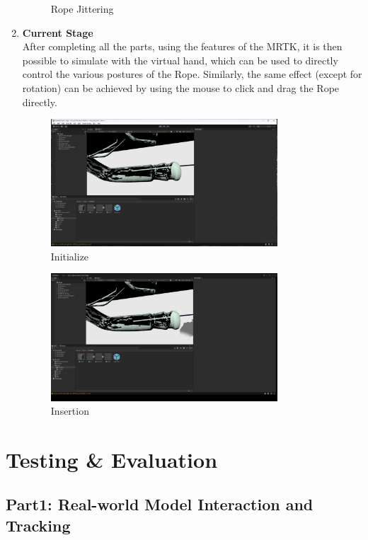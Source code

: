 \documentclass[12pt]{article}
\begin{document}
\begin{enumerate}
\begin{figure}[H]
            \caption{Rope Jittering}
      \end{figure}
      \item \textbf{Current Stage}
      \\
      After completing all the parts, using the features of the MRTK, it is then possible to simulate with the virtual hand, which can be used to directly control the various postures of the Rope. Similarly, the same effect (except for rotation) can be achieved by using the mouse to click and drag the Rope directly.
      \begin{figure}[H]
            \centering
            \includegraphics[width=0.8\textwidth]{recent stage.png}
            \caption{Initialize}
      \end{figure}
      \begin{figure}[H]
            \centering
            \includegraphics[width=0.8\textwidth]{Insert.png}
            \caption{Insertion}
      \end{figure}
\end{enumerate}


\section{Testing \& Evaluation}
\subsection{Part1: Real-world Model Interaction and Tracking}
\end{document}
